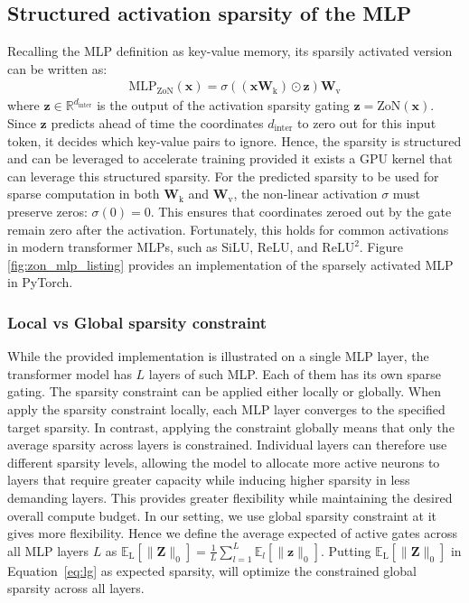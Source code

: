 \documentclass{article} %
\begin{document}
\subsection{Structured activation sparsity of the MLP}

Recalling the MLP definition as key-value memory, its sparsily activated version can be written as:
\begin{align}
    \text{MLP}_{\text{ZoN}}(\mathbf{x}) = \sigma((\mathbf{x} \textbf{W}_{\text{k}}) \odot \mathbf{z}) \textbf{W}_{\text{v}}
\end{align}
where $\mathbf{z} \in \mathbb{R}^{d_{\text{inter}}}$ is the output of the activation sparsity gating
$\mathbf{z} = {\mathrm{ZoN}}(\mathbf{x})$.
Since $\mathbf{z}$ predicts ahead of time the coordinates $d_{\text{inter}}$ to zero out
for this input token, it decides which key-value pairs to ignore. Hence,
the sparsity is structured and can be leveraged to accelerate training provided
it exists a GPU kernel that can leverage this structured sparsity.
For the predicted sparsity to be used for sparse computation in both
$\textbf{W}_{\text{k}}$ and $\textbf{W}_{\text{v}}$, the non-linear activation
$\sigma$ must preserve zeros: $\sigma(0) = 0$. This ensures that coordinates
zeroed out by the gate remain zero after the activation. Fortunately, this holds
for common activations in modern transformer MLPs, such as SiLU, ReLU, and
$\mathrm{ReLU}^{2}$.
Figure \ref{fig:zon_mlp_listing} provides an implementation of the sparsely
activated MLP in PyTorch.

\subsubsection{Local vs Global sparsity constraint}
While the provided implementation is illustrated on a single MLP layer, the transformer
model has $L$ layers of such MLP. Each of them has its own sparse gating.
The sparsity constraint can be applied either locally or globally. When apply
the sparsity constraint locally, each MLP layer converges to the specified
target sparsity.
In contrast, applying the constraint globally means that only the average 
sparsity across layers is constrained. Individual layers can therefore use 
different sparsity levels, allowing the model to allocate more active neurons to 
layers that require greater capacity while inducing higher sparsity 
in less demanding layers. This provides greater flexibility while maintaining 
the desired overall compute budget. In our setting, we use global sparsity
constraint at it gives more flexibility. Hence we define
the average expected of active gates across all MLP layers $L$ as 
$\mathbb{E}_{\text{L}}\!\left[\|\mathbf{Z}\|_0\right] = \frac{1}{L} \sum_{l=1}^{L}\mathbb{E}_{l}\!\left[\|\mathbf{z}\|_0\right].$
Putting $\mathbb{E}_{\text{L}}\!\left[\|\mathbf{Z}\|_0\right]$ in Equation~\ref{eq:lg}
as expected sparsity, will optimize the constrained global sparsity across all layers.
\end{document}
